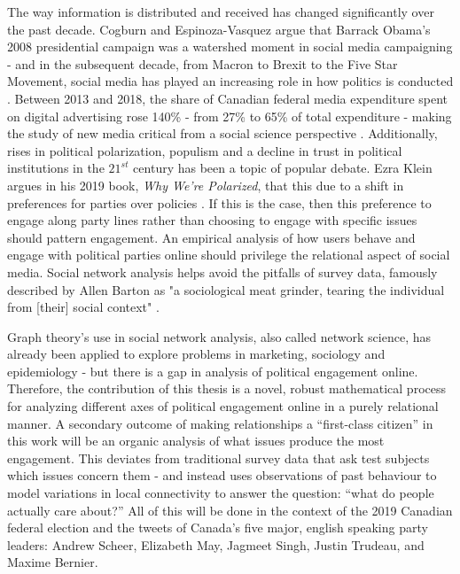 The way information is distributed and received has changed significantly over the past decade. Cogburn and Espinoza-Vasquez argue that Barrack Obama’s 2008 presidential campaign was a watershed moment in social media campaigning - and in the subsequent decade, from Macron to Brexit to the Five Star Movement, social media has played an increasing role in how politics is conducted \cite{cogburn2011networked}. Between 2013 and 2018, the share of Canadian federal media expenditure spent on digital advertising rose 140\% - from 27\% to 65\% of total expenditure - making the study of new media critical from a social science perspective \cite{annualReportCanadaAdvertisingActivities_2018}. Additionally, rises in political polarization, populism and a decline in trust in political institutions in the $21^{st}$ century has been a topic of popular debate. Ezra Klein argues in his 2019 book, \emph{Why We're Polarized}, that this due to a shift in preferences for parties over policies \cite{levitsky2018democracies}. If this is the case, then this preference to engage along party lines rather than choosing to engage with specific issues should pattern engagement. An empirical analysis of how users behave and engage with political parties online should privilege the relational aspect of social media. Social network analysis helps avoid the pitfalls of survey data, famously described by Allen Barton as "a sociological meat grinder, tearing the individual from [their] social context" \cite{freeman2004development}.

Graph theory’s use in social network analysis, also called network science, has already been applied to explore problems in marketing, sociology and epidemiology - but there is a gap in analysis of political engagement online. Therefore, the contribution of this thesis is a novel, robust mathematical process for analyzing different axes of political engagement online in a purely relational manner. A secondary outcome of making relationships a “first-class citizen” in this work will be an organic analysis of what issues produce the most engagement. This deviates from traditional survey data that ask test subjects which issues concern them - and instead uses observations of past behaviour to model variations in local connectivity to answer the question: “what do people actually care about?” All of this will be done in the context of the 2019 Canadian federal election and the tweets of Canada's five major, english speaking party leaders: Andrew Scheer, Elizabeth May, Jagmeet Singh, Justin Trudeau, and Maxime Bernier. 

